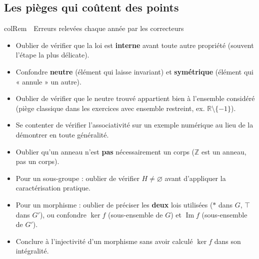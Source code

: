 \documentclass[11pt,a4paper]{article}
\newenvironment{remarque}[1][Remarque]
  {\begin{fiche}{colRem}{\ding{43}~~#1}}{\end{fiche}}
\begin{document}
\subsection{Les pièges qui coûtent des points}

\begin{remarque}[Erreurs relevées chaque année par les correcteurs]
\begin{itemize}[leftmargin=6mm, itemsep=0.5mm]
  \item Oublier de vérifier que la loi est \textbf{interne} avant toute autre propriété (souvent l'étape la plus délicate).
  \item Confondre \textbf{neutre} (élément qui laisse invariant) et \textbf{symétrique} (élément qui « annule » un autre).
  \item Oublier de vérifier que le neutre trouvé appartient bien à l'ensemble considéré (piège classique dans les exercices avec ensemble restreint, ex. $\mathbb{R}\setminus\{-1\}$).
  \item Se contenter de vérifier l'associativité sur un exemple numérique au lieu de la démontrer en toute généralité.
  \item Oublier qu'un anneau n'est \textbf{pas} nécessairement un corps ($\mathbb{Z}$ est un anneau, pas un corps).
  \item Pour un sous-groupe : oublier de vérifier $H\ne\varnothing$ avant d'appliquer la caractérisation pratique.
  \item Pour un morphisme : oublier de préciser les \textbf{deux} lois utilisées ($*$ dans $G$, $\top$ dans $G'$), ou confondre $\ker f$ (sous-ensemble de $G$) et $\operatorname{Im}f$ (sous-ensemble de $G'$).
  \item Conclure à l'injectivité d'un morphisme sans avoir calculé $\ker f$ dans son intégralité.
\end{itemize}
\end{remarque}
\end{document}
